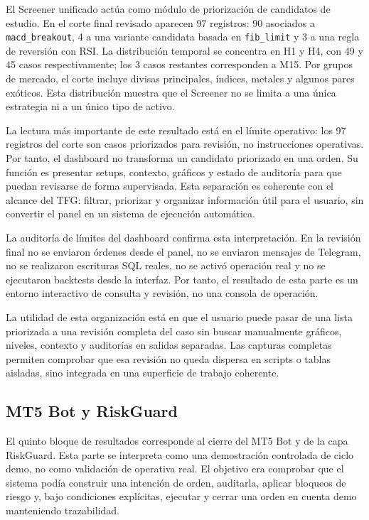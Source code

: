 El Screener unificado act\'ua como m\'odulo de priorizaci\'on de candidatos de estudio. En el corte
final revisado aparecen 97 registros: 90 asociados a \texttt{macd\_breakout}, 4
a una variante candidata basada en \texttt{fib\_limit} y 3 a una regla de
reversi\'on con RSI. La distribuci\'on temporal se concentra en H1 y H4, con 49 y
45 casos respectivamente; los 3 casos restantes corresponden a M15. Por grupos de mercado, el corte
incluye divisas principales, \'indices, metales y algunos pares ex\'oticos. Esta
distribuci\'on muestra que el Screener no se limita a una \'unica estrategia ni a
un \'unico tipo de activo.

La lectura m\'as importante de este resultado est\'a en el l\'imite operativo:
los 97 registros del corte son casos priorizados para revisi\'on, no
instrucciones operativas. Por tanto, el dashboard no transforma un
candidato priorizado en una orden. Su funci\'on es presentar setups, contexto, gr\'aficos y
estado de auditor\'ia para que puedan revisarse de forma supervisada. Esta
separaci\'on es coherente con el alcance del TFG: filtrar, priorizar y organizar
informaci\'on \'util para el usuario, sin convertir el panel en un sistema de
ejecuci\'on autom\'atica.

La auditor\'ia de l\'imites del dashboard confirma esta interpretaci\'on. En la
revisi\'on final no se enviaron \'ordenes desde el panel, no se enviaron mensajes
de Telegram, no se realizaron escrituras SQL reales, no se activ\'o operaci\'on real
y no se ejecutaron backtests desde la interfaz. Por tanto, el resultado de esta
parte es un entorno interactivo de consulta y revisi\'on, no una consola de
operaci\'on.

La utilidad de esta organizaci\'on est\'a en que el usuario puede pasar de una
lista priorizada a una revisi\'on completa del caso sin buscar manualmente
gr\'aficos, niveles, contexto y auditor\'ias en salidas separadas. Las capturas
completas permiten comprobar que esa revisi\'on no queda dispersa en scripts o
tablas aisladas, sino integrada en una superficie de trabajo coherente.

\subsection{MT5 Bot y RiskGuard}
\label{subsec:resultados-mt5-riskguard}

El quinto bloque de resultados corresponde al cierre del MT5 Bot y de la capa
RiskGuard. Esta parte se interpreta como una demostraci\'on controlada de ciclo
demo, no como validaci\'on de operativa real. El objetivo era comprobar que el
sistema pod\'ia construir una intenci\'on de orden, auditarla, aplicar bloqueos de
riesgo y, bajo condiciones expl\'icitas, ejecutar y cerrar una orden en cuenta
demo manteniendo trazabilidad.

